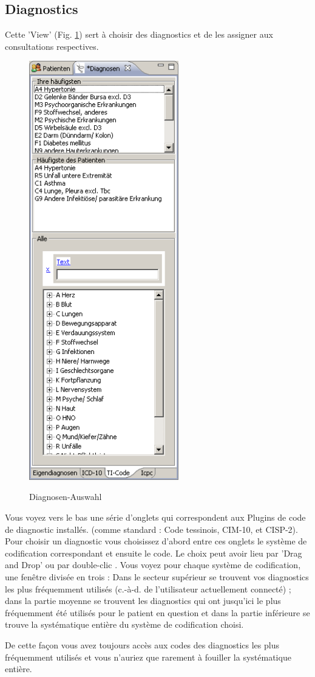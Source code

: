\subsection{Diagnostics}
\label{view:diagnosen} 
Cette 'View' (Fig. \ref{fig:diagnosen}) sert à choisir des diagnostics et de les assigner aux consultations respectives. \begin{figure}
    \includegraphics[width=6.5cm]{images/diagnosenview}
    \label{fig:diagnosen}
    \caption{Diagnosen-Auswahl}
\end{figure}
Vous voyez vers le bas une série d'onglets qui correspondent aux Plugins de code de diagnostic installés. (comme standard : Code tessinois, CIM-10, et CISP-2). Pour choisir un diagnostic vous choisissez d'abord entre ces onglets le système de codification correspondant et ensuite le code.
Le choix peut avoir lieu par 'Drag and Drop' ou par double-clic .
Vous voyez pour chaque système de codification, une fenêtre divisée en trois : Dans le secteur supérieur se trouvent vos diagnostics les plus fréquemment utilisés (c.-à-d. de l'utilisateur actuellement connecté) ; dans la partie moyenne se trouvent les diagnostics qui ont jusqu'ici le plus fréquemment été utilisés pour le patient en question et dans la partie inférieure se trouve la systématique entière du système de codification choisi.



\medskip

De cette façon vous avez toujours accès aux codes des diagnostics les plus fréquemment utilisés et vous n'auriez que rarement à fouiller la systématique entière.

